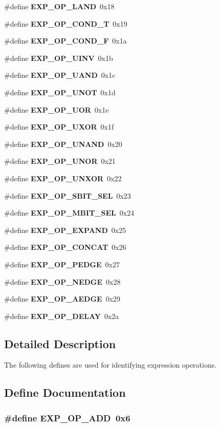 \begin{CompactItemize}
\#define {\bf EXP\_\-OP\_\-LAND}\ 0x18
\item 
\#define {\bf EXP\_\-OP\_\-COND\_\-T}\ 0x19
\item 
\#define {\bf EXP\_\-OP\_\-COND\_\-F}\ 0x1a
\item 
\#define {\bf EXP\_\-OP\_\-UINV}\ 0x1b
\item 
\#define {\bf EXP\_\-OP\_\-UAND}\ 0x1c
\item 
\#define {\bf EXP\_\-OP\_\-UNOT}\ 0x1d
\item 
\#define {\bf EXP\_\-OP\_\-UOR}\ 0x1e
\item 
\#define {\bf EXP\_\-OP\_\-UXOR}\ 0x1f
\item 
\#define {\bf EXP\_\-OP\_\-UNAND}\ 0x20
\item 
\#define {\bf EXP\_\-OP\_\-UNOR}\ 0x21
\item 
\#define {\bf EXP\_\-OP\_\-UNXOR}\ 0x22
\item 
\#define {\bf EXP\_\-OP\_\-SBIT\_\-SEL}\ 0x23
\item 
\#define {\bf EXP\_\-OP\_\-MBIT\_\-SEL}\ 0x24
\item 
\#define {\bf EXP\_\-OP\_\-EXPAND}\ 0x25
\item 
\#define {\bf EXP\_\-OP\_\-CONCAT}\ 0x26
\item 
\#define {\bf EXP\_\-OP\_\-PEDGE}\ 0x27
\item 
\#define {\bf EXP\_\-OP\_\-NEDGE}\ 0x28
\item 
\#define {\bf EXP\_\-OP\_\-AEDGE}\ 0x29
\item 
\#define {\bf EXP\_\-OP\_\-DELAY}\ 0x2a
\end{CompactItemize}


\subsection{Detailed Description}
The following defines are used for identifying expression operations. 

\subsection{Define Documentation}
\subsubsection{\setlength{\rightskip}{0pt plus 5cm}\#define EXP\_\-OP\_\-ADD\ 0x6}\label{group__expr__ops_a6}


